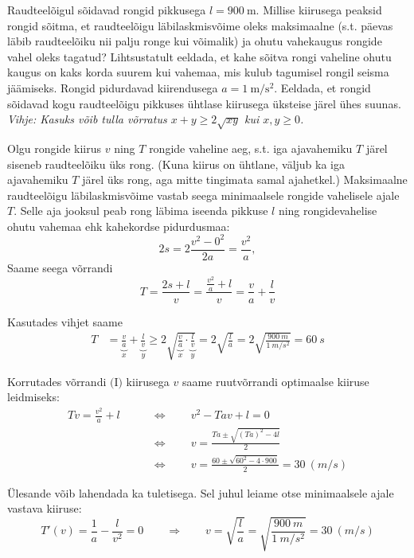 
Raudteelõigul sõidavad rongid pikkusega $l=\SI{900}{\m}$. Millise kiirusega peaksid rongid sõitma, et raudteelõigu läbilaskmisvõime oleks maksimaalne (s.t. päevas läbib raudteelõiku nii palju ronge kui võimalik) ja ohutu vahekaugus rongide vahel oleks tagatud? Lihtsustatult eeldada, et kahe sõitva rongi vaheline ohutu kaugus on kaks korda suurem kui vahemaa, mis kulub tagumisel rongil seisma jäämiseks. Rongid pidurdavad kiirendusega $a=\SI{1}{\m\per\s\squared}$. Eeldada, et rongid sõidavad kogu raudteelõigu pikkuses ühtlase kiirusega üksteise järel ühes suunas. \\
\textit{Vihje: Kasuks võib tulla võrratus $x+y \geq 2\sqrt{xy}$ kui $x, y \geq 0$.}




\hint

\solu
Olgu rongide kiirus $v$ ning $T$ rongide vaheline aeg, s.t. iga ajavahemiku $T$ järel siseneb raudteelõiku üks rong. (Kuna kiirus on ühtlane, väljub ka iga ajavahemiku $T$ järel üks rong, aga mitte tingimata samal ajahetkel.) Maksimaalne raudteelõigu läbilaskmisvõime vastab seega minimaalsele rongide vahelisele ajale $T$. Selle aja jooksul peab rong läbima iseenda pikkuse $l$ ning rongidevahelise ohutu vahemaa ehk kahekordse pidurdusmaa:
\begin{equation*}
    2s = 2\frac{v^2-0^2}{2a}=\frac{v^2}{a},
\end{equation*}
Saame seega võrrandi 
\begin{equation*}
    T = \frac{2s+l}{v} = \frac{\frac{v^2}{a}+l}{v} = \frac{v}{a} + \frac{l}{v} \tag{I}
\end{equation*}

Kasutades vihjet saame
\begin{align*}
    T &= \underbrace{\frac{v}{a}}_{x} + \underbrace{\frac{l}{v}}_{y} \geq 2 \sqrt{\underbrace{\frac{v}{a}}_{x} \cdot \underbrace{\frac{l}{v}}_{y}} 
    = 2\sqrt{\frac{l}{a}} = 2 \sqrt{\frac{\SI{900}{m}}{\SI{1}{m/s^2}}} = \SI{60}{s} \tag{II}
\end{align*}

Korrutades võrrandi $\text{(I)}$ kiirusega $v$ saame ruutvõrrandi optimaalse kiiruse leidmiseks:
\begin{align*}
    Tv = \frac{v^2}{a}+l \qquad &\Longleftrightarrow \qquad v^2 - Tav + l = 0 \\
                                &\Longleftrightarrow \qquad v = \frac{Ta \pm \sqrt{(Ta)^2 - 4l}}{2} \\
                                &\Longleftrightarrow \qquad v = \frac{60 \pm \sqrt{60^2 - 4\cdot 900}}{2} = \SI{30}{(m/s)}
\end{align*}

Ülesande võib lahendada ka tuletisega. Sel juhul leiame otse minimaalsele ajale vastava kiiruse:
$$
T'(v) = \frac{1}{a}-\frac{l}{v^2} = 0 \qquad \Longrightarrow \qquad v = \sqrt{\frac{l}{a}} = \sqrt{\frac{\SI{900}{m}}{\SI{1}{m/s^2}}} = \SI{30}{(m/s)}
$$
\probend